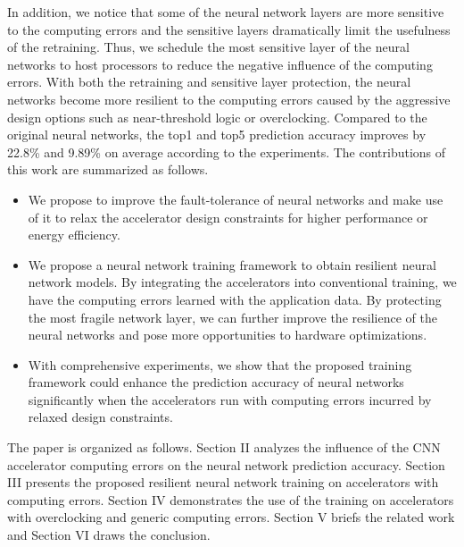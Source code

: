 In addition, we notice that some of the neural network layers are more sensitive to the 
computing errors and the sensitive layers dramatically limit the usefulness of the retraining. 
Thus, we schedule the most sensitive layer of the neural networks to host processors to reduce the negative influence 
of the computing errors. With both the retraining and sensitive layer protection, 
the neural networks become more resilient to the computing errors caused by 
the aggressive design options such as near-threshold logic or overclocking.
Compared to the original neural networks, the top1 and top5 prediction accuracy
improves by 22.8\% and 9.89\% on average according to the experiments. 
The contributions of this work are summarized as follows.

\begin{itemize}
	\item We propose to improve the fault-tolerance of neural networks and make use of it to relax 
		the accelerator design constraints for higher performance or energy efficiency.

	\item We propose a neural network training framework to obtain resilient neural network models. 
		By integrating the accelerators into conventional training, we have the computing errors 
		learned with the application data. By protecting the most fragile network layer, 
		we can further improve the resilience of the neural networks and pose more 
		opportunities to hardware optimizations.

	\item With comprehensive experiments, we show that the proposed training framework 
		could enhance the prediction accuracy of neural networks significantly 
		when the accelerators run with computing errors incurred by relaxed design constraints.
\end{itemize}
The paper is organized as follows. Section II analyzes the influence of 
the CNN accelerator computing errors on the neural network prediction accuracy. 
Section III presents the proposed resilient neural network training on accelerators with computing errors.
Section IV demonstrates the use of the training on accelerators with overclocking and generic computing errors. 
Section V briefs the related work and Section VI draws the conclusion. 


